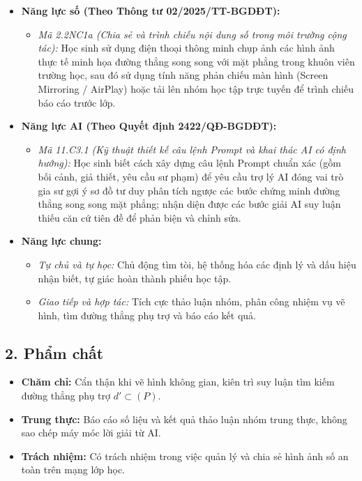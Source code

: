 \documentclass[12pt, a4paper]{article}
\begin{document}
\begin{itemize}[leftmargin=1.2cm]
    \item \textbf{Năng lực số (Theo Thông tư 02/2025/TT-BGDĐT):}
    \begin{itemize}[leftmargin=0.6cm]
        \item \textit{Mã 2.2NC1a (Chia sẻ và trình chiếu nội dung số trong môi trường cộng tác):} Học sinh sử dụng điện thoại thông minh chụp ảnh các hình ảnh thực tế minh họa đường thẳng song song với mặt phẳng trong khuôn viên trường học, sau đó sử dụng tính năng phản chiếu màn hình (Screen Mirroring / AirPlay) hoặc tải lên nhóm học tập trực tuyến để trình chiếu báo cáo trước lớp.
    \end{itemize}

    \item \textbf{Năng lực AI (Theo Quyết định 2422/QĐ-BGDĐT):}
    \begin{itemize}[leftmargin=0.6cm]
        \item \textit{Mã 11.C3.1 (Kỹ thuật thiết kế câu lệnh Prompt và khai thác AI có định hướng):} Học sinh biết cách xây dựng câu lệnh Prompt chuẩn xác (gồm bối cảnh, giả thiết, yêu cầu sư phạm) để yêu cầu trợ lý AI đóng vai trò gia sư gợi ý sơ đồ tư duy phân tích ngược các bước chứng minh đường thẳng song song mặt phẳng; nhận diện được các bước giải AI suy luận thiếu căn cứ tiên đề để phản biện và chỉnh sửa.
    \end{itemize}

    \item \textbf{Năng lực chung:}
    \begin{itemize}[leftmargin=0.6cm]
        \item \textit{Tự chủ và tự học:} Chủ động tìm tòi, hệ thống hóa các định lý và dấu hiệu nhận biết, tự giác hoàn thành phiếu học tập.
        \item \textit{Giao tiếp và hợp tác:} Tích cực thảo luận nhóm, phân công nhiệm vụ vẽ hình, tìm đường thẳng phụ trợ và báo cáo kết quả.
    \end{itemize}
\end{itemize}

\subsection*{2. Phẩm chất}

\begin{itemize}[leftmargin=1.2cm]
    \item \textbf{Chăm chỉ:} Cẩn thận khi vẽ hình không gian, kiên trì suy luận tìm kiếm đường thẳng phụ trợ $d' \subset (P)$.
    \item \textbf{Trung thực:} Báo cáo số liệu và kết quả thảo luận nhóm trung thực, không sao chép máy móc lời giải từ AI.
    \item \textbf{Trách nhiệm:} Có trách nhiệm trong việc quản lý và chia sẻ hình ảnh số an toàn trên mạng lớp học.
\end{itemize}
\end{document}
